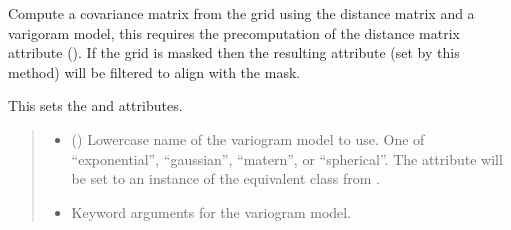 \documentclass[letterpaper,10pt,english]{sphinxmanual}
\begin{document}
\begin{fulllineitems}
\begin{fulllineitems}
\end{fulllineitems}


\begin{fulllineitems}
\label{\detokenize{grid:glomar_gridding.grid.Grid.covariance_matrix}}
\pysigstartsignatures
\pysiglinewithargsret
{}
{\sphinxparamcomma {}}
{}
\pysigstopsignatures
\sphinxAtStartPar
Compute a covariance matrix from the grid using the distance matrix and
a varigoram model, this requires the pre\sphinxhyphen{}computation of the distance
matrix attribute (). If the grid is masked then the resulting
 attribute (set by this method) will be filtered to align
with the mask.

\sphinxAtStartPar
This sets the  and  attributes.
\begin{quote}\begin{description}
\begin{itemize}
\item {}
\sphinxAtStartPar
{} () \textendash{} Lower\sphinxhyphen{}case name of the variogram model to use. One of “exponential”,
“gaussian”, “matern”, or “spherical”. The  attribute will
be set to an instance of the equivalent class from
.

\item {}
\sphinxAtStartPar
{} \textendash{} Keyword arguments for the variogram model.

\end{itemize}

\sphinxAtStartPar
{}

\end{description}\end{quote}

\end{fulllineitems}



\end{fulllineitems}
\end{document}
